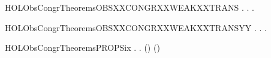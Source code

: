 \newcommand{\HOLObsCongrTheoremsOBSXXCONGRXXTRANSXXRIGHT}{\UseVerbatim{HOLObsCongrTheoremsOBSXXCONGRXXTRANSXXRIGHT}}
\begin{SaveVerbatim}{HOLObsCongrTheoremsOBSXXCONGRXXWEAKXXTRANS}
\HOLTokenTurnstile{} \HOLSymConst{\HOLTokenForall{}} .
          \HOLSymConst{\HOLTokenImp{}}
       \HOLSymConst{\HOLTokenForall{}} .  \HOLTokenWeakTransBegin{}\HOLTokenWeakTransEnd {} \HOLSymConst{\HOLTokenImp{}} \HOLSymConst{\HOLTokenExists{}}.  \HOLTokenWeakTransBegin{}\HOLTokenWeakTransEnd {} \HOLSymConst{\HOLTokenConj{}}   
\end{SaveVerbatim}
\newcommand{\HOLObsCongrTheoremsOBSXXCONGRXXWEAKXXTRANS}{\UseVerbatim{HOLObsCongrTheoremsOBSXXCONGRXXWEAKXXTRANS}}
\begin{SaveVerbatim}{HOLObsCongrTheoremsOBSXXCONGRXXWEAKXXTRANSYY}
\HOLTokenTurnstile{} \HOLSymConst{\HOLTokenForall{}} .
          \HOLSymConst{\HOLTokenImp{}}
       \HOLSymConst{\HOLTokenForall{}} .  \HOLTokenWeakTransBegin{}\HOLTokenWeakTransEnd {} \HOLSymConst{\HOLTokenImp{}} \HOLSymConst{\HOLTokenExists{}}.  \HOLTokenWeakTransBegin{}\HOLTokenWeakTransEnd {} \HOLSymConst{\HOLTokenConj{}}   
\end{SaveVerbatim}
\newcommand{\HOLObsCongrTheoremsOBSXXCONGRXXWEAKXXTRANSYY}{\UseVerbatim{HOLObsCongrTheoremsOBSXXCONGRXXWEAKXXTRANSYY}}
\begin{SaveVerbatim}{HOLObsCongrTheoremsPROPSix}
\HOLTokenTurnstile{} \HOLSymConst{\HOLTokenForall{}} .    \HOLSymConst{\HOLTokenImp{}} \HOLSymConst{\HOLTokenForall{}}.  () ()
\end{SaveVerbatim}
